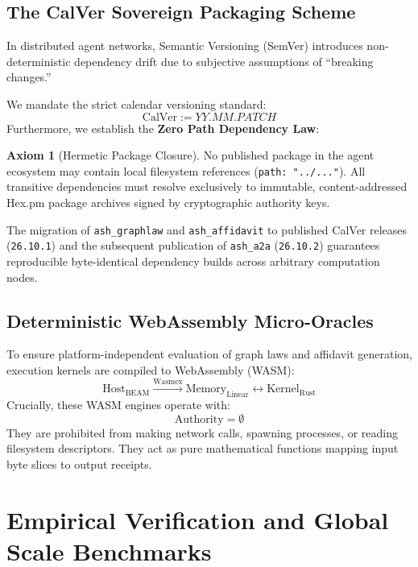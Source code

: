 \documentclass[12pt,oneside,a4paper]{book}
\theoremstyle{definition}
\newtheorem{axiom}{Axiom}[chapter]
\theoremstyle{plain}
\theoremstyle{remark}
\begin{document}
\section{The CalVer Sovereign Packaging Scheme}
In distributed agent networks, Semantic Versioning (SemVer) introduces non-deterministic dependency drift due to subjective assumptions of ``breaking changes.'' 

We mandate the strict calendar versioning standard:
\begin{equation}
    \text{CalVer} := YY.MM.PATCH
\end{equation}
Furthermore, we establish the \textbf{Zero Path Dependency Law}:
\begin{axiom}[Hermetic Package Closure]
No published package in the agent ecosystem may contain local filesystem references (\texttt{path: "../..."}). All transitive dependencies must resolve exclusively to immutable, content-addressed Hex.pm package archives signed by cryptographic authority keys.
\end{axiom}

The migration of \texttt{ash\_graphlaw} and \texttt{ash\_affidavit} to published CalVer releases (\texttt{26.10.1}) and the subsequent publication of \texttt{ash\_a2a} (\texttt{26.10.2}) guarantees reproducible byte-identical dependency builds across arbitrary computation nodes.

\section{Deterministic WebAssembly Micro-Oracles}
To ensure platform-independent evaluation of graph laws and affidavit generation, execution kernels are compiled to WebAssembly (WASM):
\begin{equation}
    \text{Host}_{\text{BEAM}} \xrightarrow{\text{Wasmex}} \text{Memory}_{\text{Linear}} \longleftrightarrow \text{Kernel}_{\text{Rust}}
\end{equation}
Crucially, these WASM engines operate with:
\begin{equation}
    \mathrm{Authority} = \emptyset
\end{equation}
They are prohibited from making network calls, spawning processes, or reading filesystem descriptors. They act as pure mathematical functions mapping input byte slices to output receipts.

\chapter{Empirical Verification and Global Scale Benchmarks}
\end{document}
